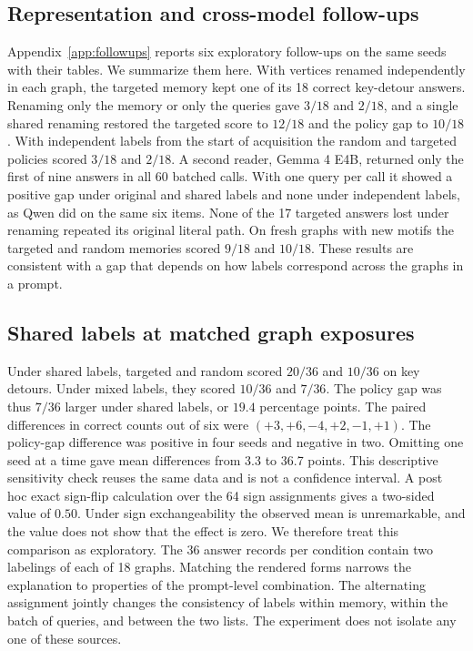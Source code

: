 \documentclass[11pt]{article}
\begin{document}
\subsection{Representation and cross-model follow-ups}

Appendix~\ref{app:followups} reports six exploratory follow-ups on the
same seeds with their tables. We summarize them here. With vertices
renamed independently in each graph, the targeted memory kept one of
its 18 correct key-detour answers. Renaming only the memory or only
the queries gave $3/18$ and $2/18$, and a single shared renaming
restored the targeted score to $12/18$ and the policy gap to $10/18$.
With independent labels from the start of acquisition the random and
targeted policies scored $3/18$ and $2/18$. A second reader, Gemma 4 E4B, returned only
the first of nine answers in all 60 batched calls. With one query per
call it showed a positive gap under original and shared labels and none
under independent labels, as Qwen did on the same six items. None of
the 17 targeted answers lost under renaming repeated its original
literal path. On fresh graphs with new motifs the targeted and random
memories scored $9/18$ and $10/18$. These results are consistent with
a gap that depends on how labels correspond across the graphs in a
prompt.

\subsection{Shared labels at matched graph exposures}

Under shared labels, targeted and random scored $20/36$ and $10/36$
on key detours. Under mixed labels, they scored $10/36$ and $7/36$.
The policy gap was thus $7/36$ larger under shared labels, or
$19.4$ percentage points. The paired differences in correct counts
out of six were $(+3,+6,-4,+2,-1,+1)$. The policy-gap difference was positive
in four seeds and negative in two. Omitting one seed at a time gave
mean differences from 3.3 to 36.7 points. This descriptive sensitivity
check reuses the same data and is not a confidence interval. A post hoc
exact sign-flip calculation over the 64 sign assignments gives a
two-sided value of $0.50$. Under sign exchangeability the observed
mean is unremarkable, and the value does not show that the effect is
zero. We therefore treat this comparison as exploratory. The 36 answer
records per condition
contain two labelings of each of 18 graphs. Matching the rendered
forms narrows the explanation to properties of the prompt-level
combination. The alternating assignment jointly changes the
consistency of labels within memory, within the batch of queries, and
between the two lists. The experiment does not isolate any one of
these sources.
\end{document}
